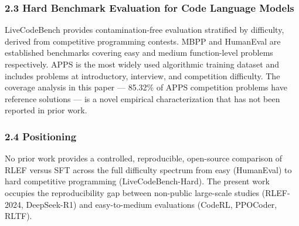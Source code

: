 \subsubsection{2.3 Hard Benchmark Evaluation for Code Language Models}

LiveCodeBench \citep{Jain2024LiveCodeBench} provides contamination-free evaluation stratified by difficulty, derived from competitive programming contests. MBPP \citep{Austin2021MBPP} and HumanEval \citep{Chen2021HumanEval} are established benchmarks covering easy and medium function-level problems respectively. APPS \citep{Hendrycks2021APPS} is the most widely used algorithmic training dataset and includes problems at introductory, interview, and competition difficulty. The coverage analysis in this paper --- 85.32\% of APPS competition problems have reference solutions --- is a novel empirical characterization that has not been reported in prior work.

\subsubsection{2.4 Positioning}

No prior work provides a controlled, reproducible, open-source comparison of RLEF versus SFT across the full difficulty spectrum from easy (HumanEval) to hard competitive programming (LiveCodeBench-Hard). The present work occupies the reproducibility gap between non-public large-scale studies (RLEF-2024, DeepSeek-R1) and easy-to-medium evaluations (CodeRL, PPOCoder, RLTF).

